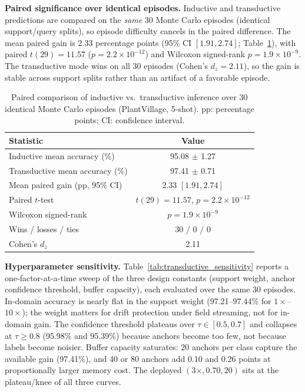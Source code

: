\documentclass[preprint,12pt]{elsarticle}
\begin{document}
\textbf{Paired significance over identical episodes.} Inductive and transductive predictions are compared on the \emph{same} 30 Monte Carlo episodes (identical support/query splits), so episode difficulty cancels in the paired difference. The mean paired gain is 2.33 percentage points (95\% CI $[1.91, 2.74]$; Table~\ref{tab:paired_test}), with paired $t(29) = 11.57$ ($p = 2.2 \times 10^{-12}$) and Wilcoxon signed-rank $p = 1.9 \times 10^{-9}$. The transductive mode wins on all 30 episodes (Cohen's $d_z = 2.11$), so the gain is stable across support splits rather than an artifact of a favorable episode.

\begin{table}[htbp]
\centering
\caption{Paired comparison of inductive vs.\ transductive inference over 30 identical Monte Carlo episodes (PlantVillage, 5-shot). pp: percentage points; CI: confidence interval.}
\label{tab:paired_test}
\footnotesize
\setlength{\tabcolsep}{4pt}
\begin{tabular*}{\columnwidth}{@{\extracolsep{\fill}}lc}
\toprule
\textbf{Statistic} & \textbf{Value} \\
\midrule
Inductive mean accuracy (\%) & 95.08 $\pm$ 1.27 \\
Transductive mean accuracy (\%) & 97.41 $\pm$ 0.71 \\
Mean paired gain (pp, 95\% CI) & 2.33 $[1.91, 2.74]$ \\
Paired $t$-test & $t(29)=11.57$, $p=2.2\times10^{-12}$ \\
Wilcoxon signed-rank & $p=1.9\times10^{-9}$ \\
Wins / losses / ties & 30 / 0 / 0 \\
Cohen's $d_z$ & 2.11 \\
\bottomrule
\end{tabular*}
\end{table}

\textbf{Hyperparameter sensitivity.} Table~\ref{tab:transductive_sensitivity} reports a one-factor-at-a-time sweep of the three design constants (support weight, anchor confidence threshold, buffer capacity), each evaluated over the same 30 episodes. In-domain accuracy is nearly flat in the support weight (97.21--97.44\% for $1\times$--$10\times$); the weight matters for drift protection under field streaming, not for in-domain gain. The confidence threshold plateaus over $\tau \in [0.5, 0.7]$ and collapses at $\tau \ge 0.8$ (95.98\% and 95.39\%) because anchors become too few, not because labels become noisier. Buffer capacity saturates: 20 anchors per class capture the available gain (97.41\%), and 40 or 80 anchors add 0.10 and 0.26 points at proportionally larger memory cost. The deployed $(3\times, 0.70, 20)$ sits at the plateau/knee of all three curves.
\end{document}
